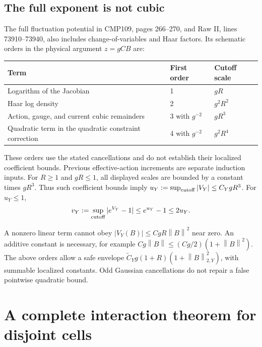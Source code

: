 \documentclass[11pt]{article}
\theoremstyle{remark}
\newcommand{\norm}[1]{\left\|#1\right\|}
\begin{document}
\subsection{The full exponent is not cubic}

The full fluctuation potential in CMP109, pages 266--270, and Raw II,
lines 73910--73940, also includes change-of-variables and Haar factors.
Its schematic orders in the physical argument $z=gCB$ are:
\begin{center}
\begin{tabular}{@{}lll@{}}
\toprule
Term & First order & Cutoff scale\\
\midrule
Logarithm of the Jacobian & 1 & $gR$\\
Haar log density & 2 & $g^2R^2$\\
Action, gauge, and current cubic remainders & 3 with $g^{-2}$ & $gR^3$\\
Quadratic term in the quadratic constraint correction & 4 with $g^{-2}$ & $g^2R^4$\\
\bottomrule
\end{tabular}
\end{center}
These orders use the stated cancellations and do not establish their
localized coefficient bounds. Previous effective-action increments
are separate induction inputs. For $R\ge1$ and $gR\le1$, all displayed
scales are bounded by a constant times $gR^3$. Thus such coefficient
bounds imply $u_Y:=\sup_{\rm cutoff}|V_Y|\le C_YgR^3$.
For $u_Y\le1$,
\begin{equation}\label{eq:interaction-v}
 v_Y:=\sup_{\rm cutoff}|e^{V_Y}-1|\le e^{u_Y}-1\le2u_Y.
\end{equation}

A nonzero linear term cannot obey $|V_Y(B)|\le CgR\norm B^2$
near zero. An additive constant is necessary, for example
$Cg\norm B\le(Cg/2)(1+\norm B^2)$. The above orders allow a
safe envelope $\widetilde C_Yg(1+R)(1+\norm B_{2,Y}^2)$,
with summable localized constants. Odd Gaussian cancellations do not
repair a false pointwise quadratic bound.

\section{A complete interaction theorem for disjoint cells}
\end{document}
